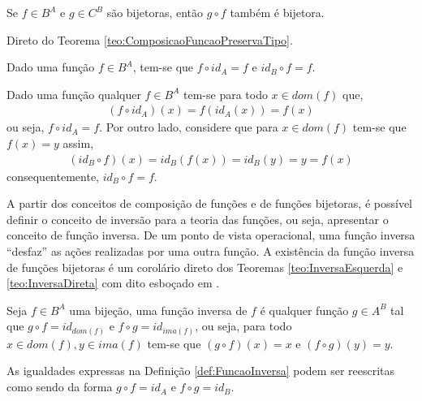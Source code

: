 \begin{corolario}\label{col:ComposicaoFuncaoPreservaTipo}
	Se $f \in B^A$ e $g \in C^B$ são bijetoras, então $g \circ f$ também é bijetora.
\end{corolario}

\begin{prova}
	Direto do Teorema \ref{teo:ComposicaoFuncaoPreservaTipo}.
\end{prova}

\begin{teorema}\label{teo:NeutralidadeDaFuncaoIdentidade}
	Dado uma função $f \in B^A$, tem-se que $f \circ id_A = f$ e $id_B \circ f = f$.
\end{teorema}

\begin{prova}
	Dado uma função qualquer $f \in B^A$ tem-se para todo $x \in dom(f)$ que, 
	\begin{eqnarray*}
		(f \circ id_A)(x) = f(id_A(x)) = f(x)
	\end{eqnarray*}
	ou seja, $f \circ id_A = f$. Por outro lado, considere que para $x \in dom(f)$ tem-se que $f(x) = y$ assim,
	\begin{eqnarray*}
		(id_B \circ f)(x) = id_B(f(x)) = id_B(y) = y = f(x)
	\end{eqnarray*}
	consequentemente, $id_B \circ f = f$.
\end{prova}

A partir dos conceitos de composição de funções e de funções bijetoras, é possível definir o conceito de inversão para a teoria das funções, ou seja, apresentar o conceito de função inversa. De um ponto de vista operacional, uma função inversa ``desfaz'' as ações realizadas por uma outra função. A existência da função inversa de funções bijetoras é um corolário direto dos Teoremas \ref{teo:InversaEsquerda} e \ref{teo:InversaDireta} com dito esboçado em \cite{zach2021-TC}.

\begin{definicao}\label{def:FuncaoInversa}
	Seja $f \in B^A$ uma bijeção, uma função inversa de $f$ é qualquer função $g \in A^B$ tal que $g \circ f = id_{dom(f)}$ e $f \circ g = id_{ima(f)}$, ou seja, para todo $x \in dom(f), y \in ima(f)$ tem-se que $(g \circ f)(x) = x$ e $(f \circ g)(y) = y$.
\end{definicao}

As igualdades expressas na Definição \ref{def:FuncaoInversa} podem ser reescritas como sendo da forma $g \circ f = id_{A}$ e $f \circ g = id_{B}$.

